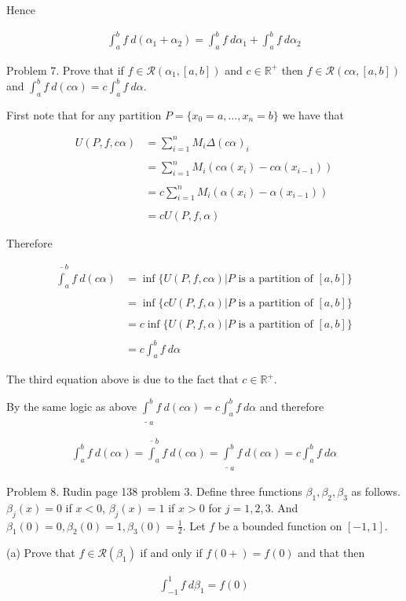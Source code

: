\documentclass{article}
\begin{document}
  Hence

  \begin{align*}
    \int_a^b f\ d(\alpha_1+\alpha_2) = \int_a^b f \ d\alpha_1+\int_a^b f \ d\alpha_2
  \end{align*}

  \pagebreak
  {\Large \color{Sepia} Problem 7. Prove that if $f\in\mathscr R(\alpha_1,[a,b])$ and $c\in \mathbb R^+$ then $f\in \mathscr R(c\alpha,[a,b])$ and $\int_a^bf\ d(c\alpha) = c\int_a^bf\ d\alpha$. }

  \vspace{1cm}

  First note that for any partition $P=\{x_0=a,\dots,x_n=b\}$ we have that

  \begin{align*}
    U(P,f,c\alpha)&=\sum_{i=1}^n M_i \Delta(c\alpha)_i \\\\
    &= \sum_{i=1}^n M_i (c\alpha(x_i)-c\alpha(x_{i-1})) \\\\
    &= c\sum_{i=1}^n M_i (\alpha(x_i)-\alpha(x_{i-1})) \\\\
    &= cU(P,f,\alpha)
  \end{align*}

  Therefore

  \begin{align*}
    \overline \int_a^b f \ d(c\alpha) &=\inf\{U(P,f,c\alpha)|P \text{ is a partition of } [a,b]\} \\\\ &= \inf\{cU(P,f,\alpha)|P \text{ is a partition of } [a,b]\} \\\\
    &= c\inf\{U(P,f,\alpha)|P \text{ is a partition of } [a,b]\} \\\\
    &= c\int_a^b f\ d\alpha
  \end{align*}

  The third equation above is due to the fact that $c\in\mathbb R^+$.

  By the same logic as above $\underline \int_a^b f \ d(c\alpha) = c\int_a^b f \ d\alpha$ and therefore

  \begin{align*}
    \int_a^b f \ d(c\alpha)=\overline \int_a^b f \ d(c\alpha)=\underline \int_a^b f \ d(c\alpha)=c\int_a^b f \ d\alpha
  \end{align*}

  \pagebreak
  {\Large \color{Sepia} Problem 8. Rudin page 138 problem 3. Define three functions $\beta_1,\beta_2,\beta_3$ as follows.  $\beta_j(x)=0$ if $x<0$, $\beta_j(x)=1$ if $x>0$ for $j=1,2,3$.  And $\beta_1(0)=0, \beta_2(0)=1,\beta_3(0)=\frac 1 2$.  Let $f$ be a bounded function on $[-1,1]$.

  (a) Prove that $f\in\mathscr R(\beta_1)$ if and only if $f(0+)=f(0)$ and that then

  \begin{align*}
    \int_{-1}^1 f\ d\beta_1 = f(0)
  \end{align*}

  }
\end{document}

